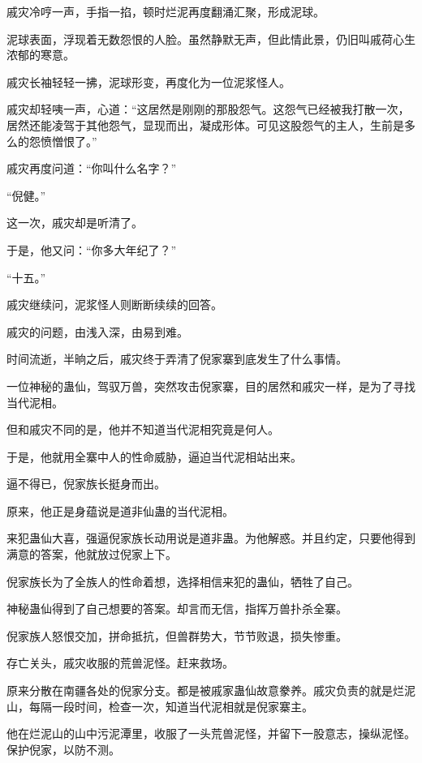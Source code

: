 
\begin{this_body}



戚灾冷哼一声，手指一掐，顿时烂泥再度翻涌汇聚，形成泥球。

泥球表面，浮现着无数怨恨的人脸。虽然静默无声，但此情此景，仍旧叫戚荷心生浓郁的寒意。

戚灾长袖轻轻一拂，泥球形变，再度化为一位泥浆怪人。

戚灾却轻咦一声，心道：“这居然是刚刚的那股怨气。这怨气已经被我打散一次，居然还能凌驾于其他怨气，显现而出，凝成形体。可见这股怨气的主人，生前是多么的怨愤憎恨了。”

戚灾再度问道：“你叫什么名字？”

“倪健。”

这一次，戚灾却是听清了。

于是，他又问：“你多大年纪了？”

“十五。”

戚灾继续问，泥浆怪人则断断续续的回答。

戚灾的问题，由浅入深，由易到难。

时间流逝，半晌之后，戚灾终于弄清了倪家寨到底发生了什么事情。

一位神秘的蛊仙，驾驭万兽，突然攻击倪家寨，目的居然和戚灾一样，是为了寻找当代泥相。

但和戚灾不同的是，他并不知道当代泥相究竟是何人。

于是，他就用全寨中人的性命威胁，逼迫当代泥相站出来。

逼不得已，倪家族长挺身而出。

原来，他正是身蕴说是道非仙蛊的当代泥相。

来犯蛊仙大喜，强逼倪家族长动用说是道非蛊。为他解惑。并且约定，只要他得到满意的答案，他就放过倪家上下。

倪家族长为了全族人的性命着想，选择相信来犯的蛊仙，牺牲了自己。

神秘蛊仙得到了自己想要的答案。却言而无信，指挥万兽扑杀全寨。

倪家族人怒恨交加，拼命抵抗，但兽群势大，节节败退，损失惨重。

存亡关头，戚灾收服的荒兽泥怪。赶来救场。

原来分散在南疆各处的倪家分支。都是被戚家蛊仙故意豢养。戚灾负责的就是烂泥山，每隔一段时间，检查一次，知道当代泥相就是倪家寨主。

他在烂泥山的山中污泥潭里，收服了一头荒兽泥怪，并留下一股意志，操纵泥怪。保护倪家，以防不测。


\end{this_body}
